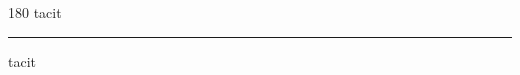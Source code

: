 
\begin{frame}
\begin{center}
\begin{turn}{180}
{\fontsize{2.5cm}{1em}\selectfont tacit}
\end{turn}
\vspace{1em}\par  
\hrule
\vspace{1em}\par  
{\fontsize{2.5cm}{1em}\selectfont tacit}
\end{center}
\end{frame}
